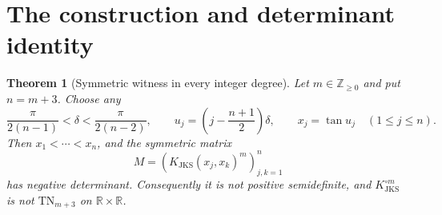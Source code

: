 \documentclass[11pt]{article}
\newtheorem{theorem}{Theorem}
\newcommand{\R}{\mathbb R}
\newcommand{\TN}{\mathrm{TN}}
\newcommand{\JKS}{\mathrm{JKS}}
\begin{document}
\section{The construction and determinant identity}

\begin{theorem}[Symmetric witness in every integer degree]\label{thm:main}
Let $m\in\mathbb Z_{\geq0}$ and put $n=m+3$.  Choose any
\[
 \frac{\pi}{2(n-1)}<\delta<\frac{\pi}{2(n-2)},
 \qquad
 u_j=\left(j-\frac{n+1}{2}\right)\delta,
 \qquad x_j=\tan u_j
 \quad(1\leq j\leq n).
\]
Then $x_1<\cdots<x_n$, and the symmetric matrix
\[
 M=\left(K_{\JKS}(x_j,x_k)^m\right)_{j,k=1}^n
\]
has negative determinant.  Consequently it is not positive semidefinite, and
$K_{\JKS}^{\circ m}$ is not $\TN_{m+3}$ on $\R\times\R$.
\end{theorem}
\end{document}
